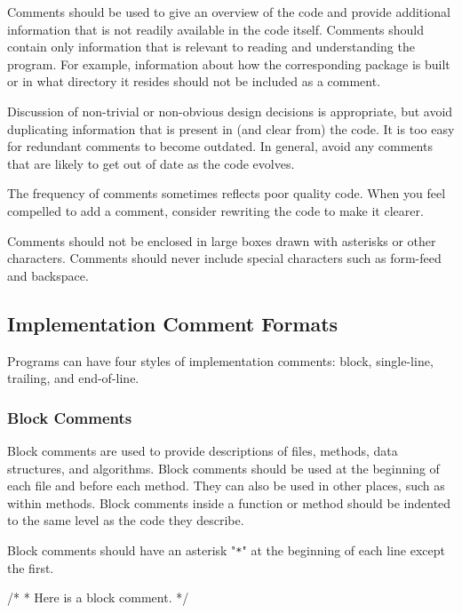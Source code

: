 \documentclass{article}
\newenvironment{note}[1]
  {\begin{notes}\item #1}{\end{notes}}
\begin{document}
Comments should be used to give an overview of the code and provide additional information that is
not readily available in the code itself. Comments should contain only information that is relevant
to reading and understanding the program. For example, information about how the corresponding
package is built or in what directory it resides should not be included as a comment.

Discussion of non-trivial or non-obvious design decisions is appropriate, but avoid duplicating
information that is present in (and clear from) the code. It is too easy for redundant comments to
become outdated. In general, avoid any comments that are likely to get out of date as the code
evolves.

\begin{note}
The frequency of comments sometimes reflects poor quality code. When you feel compelled to add a
comment, consider rewriting the code to make it clearer.
\end{note}

Comments should not be enclosed in large boxes drawn with asterisks or other characters. Comments
should never include special characters such as form-feed and backspace.

\subsection{Implementation Comment Formats}

Programs can have four styles of implementation comments: block, single-line, trailing, and
end-of-line.

\subsubsection{Block Comments}
\label{blockcomments}

Block comments are used to provide descriptions of files, methods, data structures, and algorithms.
Block comments should be used at the beginning of each file and before each method. They can also be
used in other places, such as within methods. Block comments inside a function or method should be
indented to the same level as the code they describe.

Block comments should have an asterisk "\texttt{*}" at the beginning of each line except the first.

\begin{snippet}
/*
 * Here is a block comment.
 */
\end{snippet}
\end{document}
